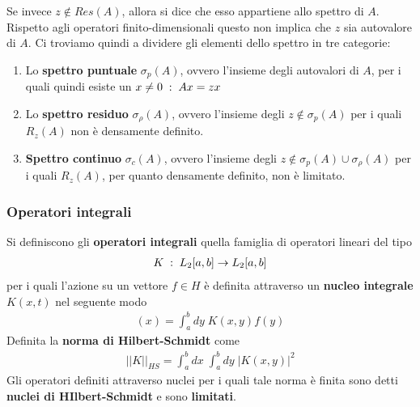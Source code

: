 Se invece $z \notin Res(A)$, allora si dice che esso appartiene allo spettro di $A$.
Rispetto agli operatori finito-dimensionali questo non implica che $z$ sia autovalore di $A$. Ci troviamo quindi a dividere gli elementi dello spettro in tre categorie:
\begin{enumerate}
	\item Lo \textbf{spettro puntuale} $\sigma_p(A)$, ovvero l'insieme degli autovalori di $A$, per i quali quindi esiste un $x \neq 0 \; : \; Ax = zx$
	 
	\item Lo \textbf{spettro residuo} $\sigma_\rho(A)$, ovvero l'insieme degli $z\notin \sigma_p(A)$ per i quali $R_z(A)$ non è densamente definito.
	
	\item \textbf{Spettro continuo} $\sigma_c(A)$, ovvero l'insieme degli $z\notin \sigma_p(A) \cup \sigma_\rho (A)$  per i quali $R_z(A)$, per quanto densamente definito, non è limitato.
\end{enumerate}

\newpage


\subsubsection{Operatori integrali}

Si definiscono gli \textbf{operatori integrali} quella famiglia di operatori lineari del tipo
\begin{align}
	K \; : \; L_2 [a,b] \rightarrow L_2 [a,b] 
\end{align}
per i quali l'azione su un vettore $f \in H$ è definita attraverso un \textbf{nucleo integrale} $K(x,t)$ nel seguente modo
\begin{align}
	[Kf](x) =  \int_{a}^{b} dy \; K(x,y) f(y)  
\end{align}
Definita la \textbf{norma di Hilbert-Schmidt} come
\begin{align}
	||K||_{HS} =\int_{a}^{b} dx \; \int_{a}^{b} dy \; |K(x,y)|^2
\end{align}
Gli operatori definiti attraverso nuclei per i quali tale norma è finita sono detti \textbf{nuclei di HIlbert-Schmidt} e sono \textbf{limitati}.

